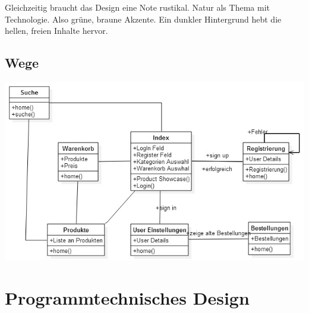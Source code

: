 \documentclass[a4paper, 11pt]{article}
\begin{document}
Gleichzeitig braucht das Design eine Note rustikal. Natur als Thema mit Technologie. Also grüne, braune Akzente.
Ein dunkler Hintergrund hebt die hellen, freien Inhalte hervor. 

\subsection{Wege}
\includegraphics[width=\textwidth]{websiteWege.jpg}
\section{Programmtechnisches Design}
\end{document}
